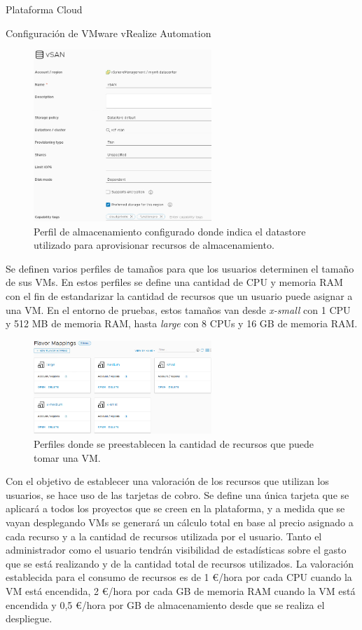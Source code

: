 \begin{subsection}{Plataforma Cloud}
\begin{subsubsection}{Configuración de VMware vRealize Automation}
\begin{figure}[h]
            \includegraphics[width=0.6\textwidth]{imaxes/pruebaconcepto/vrealize/datastore-policy.png}
            \caption{Perfil de almacenamiento configurado donde indica el datastore utilizado para aprovisionar recursos de almacenamiento.}
            \label{fig:storage-policy}
        \end{figure}
        \FloatBarrier
        Se definen varios perfiles de tamaños para que los usuarios determinen el tamaño de sus VMs. En estos perfiles se define una cantidad de CPU y memoria RAM con el fin de estandarizar la cantidad de recursos que un usuario puede asignar a una VM. En el entorno de pruebas, estos tamaños van desde \textit{x-small} con 1 CPU y 512 MB de memoria RAM, hasta \textit{large} con 8 CPUs y 16 GB de memoria RAM.
        \begin{figure}[h]
            \centering
            \includegraphics[width=0.6\textwidth]{imaxes/pruebaconcepto/vrealize/flavor-mapping.png}
            \caption{Perfiles donde se preestablecen la cantidad de recursos que puede tomar una VM.}
            \label{fig:falvor-mapping}
        \end{figure}
        \FloatBarrier
        Con el objetivo de establecer una valoración de los recursos que utilizan los usuarios, se hace uso de las tarjetas de cobro. Se define una única tarjeta que se aplicará a todos los proyectos que se creen en la plataforma, y a medida que se vayan desplegando VMs se generará un cálculo total en base al precio asignado a cada recurso y a la cantidad de recursos utilizada por el usuario. Tanto el administrador como el usuario tendrán visibilidad de estadísticas sobre el gasto que se está realizando y de la cantidad total de recursos utilizados. La valoración establecida para el consumo de recursos es de 1 €/hora por cada CPU cuando la VM está encendida, 2 €/hora por cada GB de memoria RAM cuando la VM está encendida y 0,5 €/hora por GB de almacenamiento desde que se realiza el despliegue. 

\end{subsubsection}
\end{subsection}
